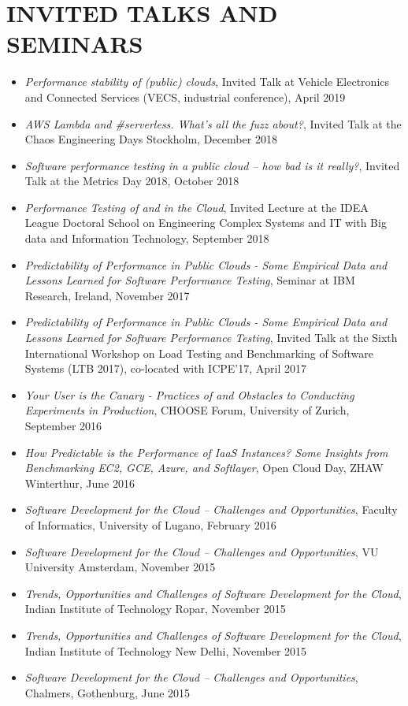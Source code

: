 \documentclass[paper=letter,fontsize=11pt]{scrartcl} %
\newcommand{\NewPart}[2]{\section*{\uppercase{#1} #2}}
\begin{document}
\NewPart{Invited Talks and Seminars}{}

\begin{itemize}
	\item \emph{Performance stability of (public) clouds}, Invited Talk at Vehicle Electronics and Connected Services (VECS, industrial conference), April 2019
	\item \emph{AWS Lambda and #serverless. What’s all the fuzz about?}, Invited Talk at the Chaos Engineering Days Stockholm, December 2018
		\item \emph{Software performance testing in a public cloud – how bad is it really?}, Invited Talk at the Metrics Day 2018, October 2018
		\item \emph{Performance Testing of and in the Cloud}, Invited Lecture at the IDEA League Doctoral School on Engineering Complex Systems and IT with Big data and Information Technology, September 2018
\item \emph{Predictability of Performance in Public Clouds - Some Empirical Data and Lessons Learned for Software Performance Testing}, Seminar at IBM Research, Ireland, November 2017
\item \emph{Predictability of Performance in Public Clouds - Some Empirical Data and Lessons Learned for Software Performance Testing}, Invited Talk at the Sixth International Workshop on Load Testing and Benchmarking of Software Systems (LTB 2017), co-located with ICPE'17, April 2017
\item \emph{Your User is the Canary - Practices of and Obstacles to Conducting Experiments in Production}, CHOOSE Forum, University of Zurich, September 2016
\item \emph{How Predictable is the Performance of IaaS Instances? Some Insights from Benchmarking EC2, GCE, Azure, and Softlayer}, Open Cloud Day, ZHAW Winterthur, June 2016
\item \emph{Software Development for the Cloud – Challenges and Opportunities}, Faculty of Informatics, University of Lugano, February 2016
\item \emph{Software Development for the Cloud – Challenges and Opportunities}, VU University Amsterdam, November 2015
\item \emph{Trends, Opportunities and Challenges of Software Development for the Cloud}, Indian Institute of Technology Ropar, November 2015
\item \emph{Trends, Opportunities and Challenges of Software Development for the Cloud}, Indian Institute of Technology New Delhi, November 2015
\item \emph{Software Development for the Cloud -- Challenges and Opportunities}, Chalmers, Gothenburg, June 2015

\end{itemize}
\end{document}
